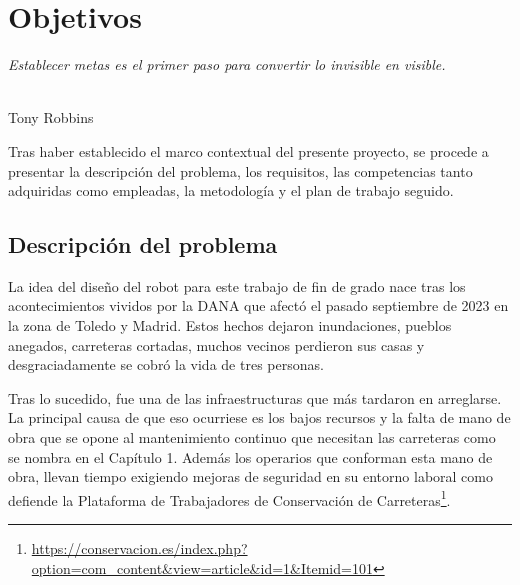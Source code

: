 \chapter{Objetivos}
\label{cap:capitulo3}

\begin{flushright}
\begin{minipage}[]{10cm}
\emph{Establecer metas es el primer paso para convertir lo invisible en visible.}\\
\end{minipage}\\

Tony Robbins\\
\end{flushright}

\vspace{1cm}
\setcounter{footnote}{30} 

Tras haber establecido el marco contextual del presente proyecto, se procede a presentar la descripción del problema, los requisitos, las competencias tanto adquiridas como empleadas, la metodología y el plan de trabajo seguido.

\section{Descripción del problema}
\label{sec:descripcion}

La idea del diseño del robot para este trabajo de fin de grado nace tras los acontecimientos vividos por la \ac{DANA} que afectó el pasado septiembre de 2023 en la zona de Toledo y Madrid. Estos hechos dejaron inundaciones, pueblos anegados, carreteras cortadas, muchos vecinos perdieron sus casas y desgraciadamente se cobró la vida de tres personas. 

Tras lo sucedido, fue una de las infraestructuras que más tardaron en arreglarse. La principal causa de que eso ocurriese es los bajos recursos y la falta de mano de obra que se opone al mantenimiento continuo que necesitan las carreteras como se nombra en el Capítulo 1. Además los operarios que conforman esta mano de obra, llevan tiempo exigiendo mejoras de seguridad en su entorno laboral como defiende la Plataforma de Trabajadores de Conservación de Carreteras\footnote{\url{https://conservacion.es/index.php?option=com_content&view=article&id=1&Itemid=101}}.
   
